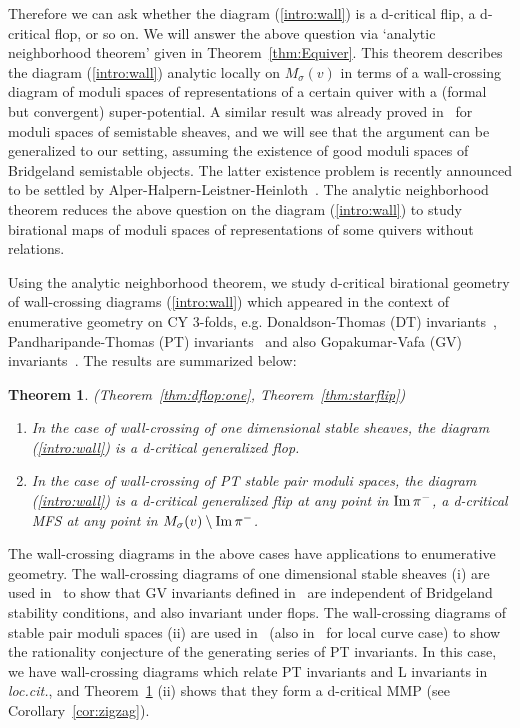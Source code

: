 \documentclass[11pt]{amsart}
\theoremstyle{plain}
\newtheorem{thm}{Theorem}[section]
\theoremstyle{definition}
\theoremstyle{remark}
\newcommand{\Imm}{\mathop{\rm Im}\nolimits}
\begin{document}
Therefore we can ask whether the diagram (\ref{intro:wall}) is a 
d-critical flip, a d-critical flop, or so on. 
We will answer the above question via `analytic neighborhood theorem'
given in Theorem~\ref{thm:Equiver}. 
This theorem describes the diagram (\ref{intro:wall}) 
analytic locally on $M_{\sigma}(v)$ in 
terms of a wall-crossing diagram of moduli spaces of representations 
of a certain quiver with a (formal but convergent) super-potential. 
A similar result was already proved in~\cite{Todstack}
for moduli spaces of semistable sheaves, and 
we will see that 
the argument can be generalized to our setting, 
assuming the 
existence of good moduli spaces of Bridgeland semistable objects.
The latter existence problem is recently announced to be settled 
by Alper-Halpern-Leistner-Heinloth~\cite{AHLH}. 
The analytic neighborhood theorem
 reduces the above question on the diagram (\ref{intro:wall})
to study birational maps of 
moduli spaces of representations of some quivers without 
relations. 

Using the analytic neighborhood theorem, 
we study d-critical birational geometry of  
wall-crossing diagrams (\ref{intro:wall}) which
appeared in the context of enumerative geometry on
CY 3-folds, e.g. Donaldson-Thomas (DT) invariants~\cite{Thom}, 
Pandharipande-Thomas (PT) invariants~\cite{PT} and also
Gopakumar-Vafa (GV) invariants~\cite{MT}. 
The results are summarized below: 
 
\begin{thm}\emph{(Theorem~\ref{thm:dflop:one}, Theorem~\ref{thm:starflip})}\label{thm:intro:main}
\begin{enumerate}
\item 
In the case of wall-crossing of one dimensional stable sheaves, 
the diagram (\ref{intro:wall}) is a d-critical generalized flop. 

\item In the case of wall-crossing of PT stable 
pair moduli spaces, the 
diagram (\ref{intro:wall}) 
is a d-critical generalized flip 
at any point in $\Imm \pi^-$, 
a d-critical MFS
at any point in $M_{\sigma}(v) \setminus \Imm \pi^-$. 
\end{enumerate}
\end{thm}
The wall-crossing diagrams
in the above cases have applications to enumerative geometry. 
The wall-crossing diagrams of one dimensional stable sheaves (i)
are used in~\cite{TodGV} to show 
that GV invariants defined in~\cite{MT} 
are independent of 
Bridgeland stability conditions,
and also invariant under flops. 
The wall-crossing diagrams of stable pair moduli 
spaces (ii) are used in~\cite{BrH, Tolim, Tolim2, Tsurvey} 
(also in~\cite{MR2888981} for local curve case) to show the 
rationality conjecture of the generating series of 
PT invariants. 
In this case, we have wall-crossing 
diagrams 
which relate PT invariants 
and L invariants 
in \textit{loc.cit.}, 
and Theorem~\ref{thm:intro:main} (ii) shows that they
form a d-critical MMP (see Corollary~\ref{cor:zigzag}). 
\end{document}
